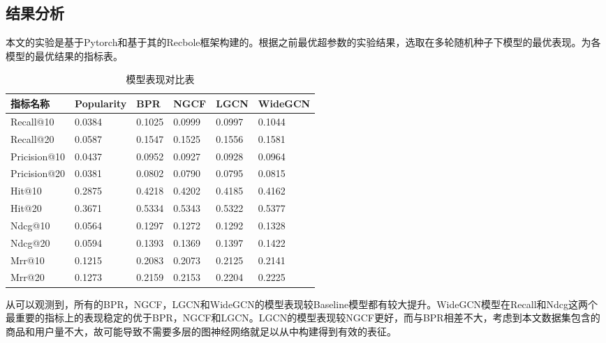 \documentclass[lang=cn,11pt,a4paper,cite=authoryear]{elegantpaper}
\begin{document}
\subsection{结果分析}
本文的实验是基于Pytorch和基于其的Recbole\cite{zhao_recbole_2021}框架构建的。根据之前最优超参数的实验结果，选取在多轮随机种子下模型的最优表现。为各模型的最优结果的指标表。
  \begin{table}[!htb]
    \centering
    \caption{模型表现对比表}
      \huge
      \begin{tabular}{C{2cm}|C{1.5cm}|C{1.5cm}|C{1.5cm}|C{1.5cm}|C{1.5cm}}
      \hline
      \textbf{指标名称} & \textbf{Popularity} & \textbf{BPR} & \textbf{NGCF} & \textbf{LGCN} & \textbf{WideGCN} \\
      \hline
      Recall@10 & 0.0384 & 0.1025 & 0.0999 & 0.0997 & 0.1044\\
      Recall@20 & 0.0587 & 0.1547 & 0.1525 & 0.1556 & 0.1581\\
      Pricision@10 & 0.0437 & 0.0952 & 0.0927 & 0.0928 & 0.0964\\
      Pricision@20 & 0.0381 & 0.0802 & 0.0790 & 0.0795 & 0.0815\\
      Hit@10 & 0.2875 & 0.4218 & 0.4202 & 0.4185 & 0.4162 \\
      Hit@20 & 0.3671 & 0.5334 & 0.5343 & 0.5322 & 0.5377 \\
      Ndcg@10 & 0.0564 & 0.1297 & 0.1272 & 0.1292 & 0.1328 \\
      Ndcg@20 & 0.0594 & 0.1393 & 0.1369 & 0.1397 & 0.1422 \\
      Mrr@10 & 0.1215 & 0.2083 & 0.2073 & 0.2125 & 0.2141 \\
      Mrr@20 & 0.1273 & 0.2159 & 0.2153 & 0.2204 & 0.2225 \\
      \hline
      \end{tabular}
    \label{模型实验指标结果}
  \end{table}

  从可以观测到，所有的BPR，NGCF，LGCN和WideGCN的模型表现较Baseline模型都有较大提升。WideGCN模型在Recall和Ndcg这两个最重要的指标上的表现稳定的优于BPR，NGCF和LGCN。LGCN的模型表现较NGCF更好，而与BPR相差不大，考虑到本文数据集包含的商品和用户量不大，故可能导致不需要多层的图神经网络就足以从中构建得到有效的表征。
  
\end{document}
